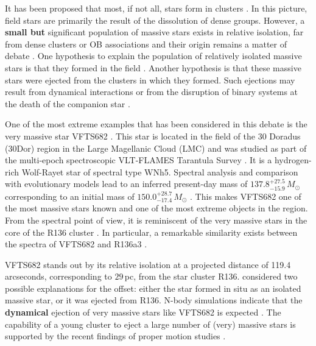 \documentclass[a4paper,fleqn,usenatbib]{mnras}
\newcommand{\newtext}[1]{{\color{ForestGreen}\bf{#1}}}
\newcommand{\Msun}{{\,\mathrm{M}_\odot}}
\begin{document}
It has been proposed that most, if not all, stars form in clusters
\citep[and references therein]{lada:03}. In this picture, field stars are primarily the result
of the dissolution of dense groups.  However, a \newtext{small but} significant population
of massive stars exists in relative isolation, far from dense clusters
or OB associations and their origin remains a matter of debate
\citep{gvaramadze:12, lamb:16,ward:18}. One hypothesis to explain
the population of relatively isolated massive stars is that they
formed in the field \citep[e.g.,][]{parker:07}. Another
hypothesis is that these massive stars were ejected from the clusters
in which they formed. Such ejections may result from dynamical interactions \citep[e.g.,][]{poveda:67} or from the disruption of binary systems at the death of the companion  star \citep[e.g.,][]{blaauw:61, renzo:18}. 

\vspace*{-9pt}
One of the most extreme examples that has been considered in this
debate is the very massive star VFTS682  \citep[][]{bestenlehner:11,
  bressert:12}. This star is located in the field of the 30 Doradus
(30Dor) region in the Large Magellanic Cloud (LMC) and was studied as part of the multi-epoch spectroscopic VLT-FLAMES Tarantula Survey \citep[VFTS,][]{evans:11}. It is a hydrogen-rich Wolf-Rayet star of spectral type WNh5. Spectral analysis and comparison with evolutionary models lead to an inferred present-day mass of $137.8^{+27.5}_{-15.9}\,M_\odot$ corresponding to an initial mass of $150.0^{+28.7}_{-17.4}\,M_\odot$
\citep{schneider:18}. 
This makes VFTS682 one of the most massive stars known and one of the most extreme objects in the region.
From the spectral point of view, it is reminiscent of the very
massive stars in the core of the R136 cluster \citep{dekoter:97,crowther:10, crowther:16}. 
In particular, a remarkable similarity exists between the
spectra of VFTS682 and R136a3 \citep{rubio-diez:17}.%

VFTS682 stands out by its relative isolation at a projected distance of 119.4 arcseconds, corresponding to 
$29$\,pc, from  the star cluster R136. \citet{bestenlehner:11}
considered two possible explanations for the offset: either
the star formed in situ as an isolated massive star, or it was ejected from  R136. N-body simulations 
indicate that the \newtext{dynamical} ejection of very massive stars like VFTS682 is
expected \citep[e.g.][]{fujii:11, banerjee:12}. The capability of a
young cluster to eject a large number of (very) massive stars is supported by
the recent findings of proper motion studies \citep[e.g.,][]{lennon:18, drew:18}.
\end{document}
